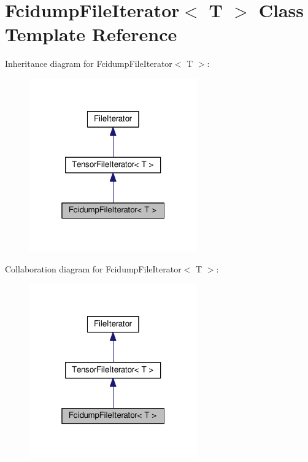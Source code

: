 \hypertarget{classFcidumpFileIterator}{}\section{Fcidump\+File\+Iterator$<$ T $>$ Class Template Reference}
\label{classFcidumpFileIterator}


Inheritance diagram for Fcidump\+File\+Iterator$<$ T $>$\+:
\nopagebreak
\begin{figure}[H]
\begin{center}
\leavevmode
\includegraphics[width=205pt]{classFcidumpFileIterator__inherit__graph}
\end{center}
\end{figure}


Collaboration diagram for Fcidump\+File\+Iterator$<$ T $>$\+:
\nopagebreak
\begin{figure}[H]
\begin{center}
\leavevmode
\includegraphics[width=205pt]{classFcidumpFileIterator__coll__graph}
\end{center}
\end{figure}
